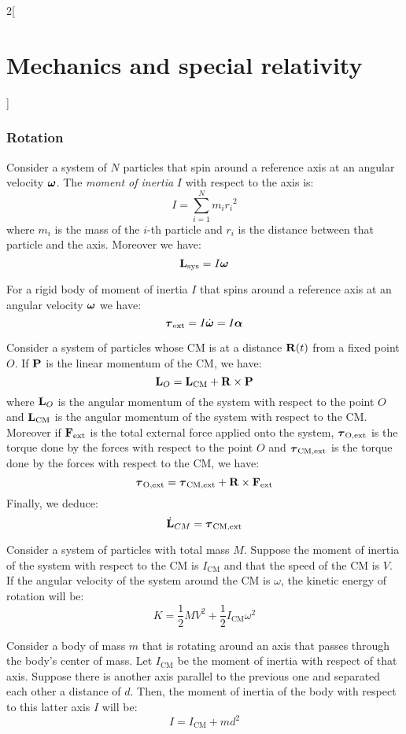 \documentclass[../../../main.tex]{subfiles}
\begin{document}
\begin{multicols}{2}[\section{Mechanics and special relativity}]
    \subsubsection*{Rotation}
    \begin{definition}
        Consider a system of $N$ particles that spin around a reference axis at an angular velocity $\vb*{\omega}$. The \textit{moment of inertia} $I$ with respect to the axis is: $$I=\sum_{i=1}^Nm_i{r_i}^2$$
        where $m_i$ is the mass of the $i$-th particle and $r_i$ is the distance between that particle and the axis. Moreover we have: $$\boldsymbol{\mathrm{L}}_\text{sys}=I\vb*{\omega}$$
    \end{definition}
    \begin{prop}
        For a rigid body of moment of inertia $I$ that spins around a reference axis at an angular velocity $\vb*{\omega}$ we have: $$\vb*{\tau}_\text{ext}=I\dot{\vb*{\omega}}=I\vb*{\alpha}$$
    \end{prop}
    \begin{prop}
        Consider a system of particles whose CM is at a distance $\boldsymbol{\mathrm{R}}(t)$ from a fixed point $O$. If $\boldsymbol{\mathrm{P}}$ is the linear momentum of the CM, we have: $$\boldsymbol{\mathrm{L}}_O=\boldsymbol{\mathrm{L}}_\text{CM}+\boldsymbol{\mathrm{R}}\times\boldsymbol{\mathrm{P}}$$ where $\boldsymbol{\mathrm{L}}_O$ is the angular momentum of the system with respect to the point $O$ and $\boldsymbol{\mathrm{L}}_\text{CM}$ is the angular momentum of the system with respect to the CM. Moreover if $\boldsymbol{\mathrm{F}}_\text{ext}$ is the total external force applied onto the system, $\vb*{\tau}_\text{O,ext}$ is the torque done by the forces with respect to the point $O$ and $\vb*{\tau}_\text{CM,ext}$ is the torque done by the forces with respect to the CM, we have: $$\vb*{\tau}_\text{O,ext}=\vb*{\tau}_\text{CM,ext}+\boldsymbol{\mathrm{R}}\times\boldsymbol{\mathrm{F}}_\text{ext}$$ Finally, we deduce: $$\dot{\boldsymbol{\mathrm{L}}}_{CM}=\vb*{\tau}_\text{CM,ext}$$
    \end{prop}
    \begin{prop}
        Consider a system of particles with total mass $M$. Suppose the moment of inertia of the system with respect to the CM is $I_\text{CM}$ and that the speed of the CM is $V$. If the angular velocity of the system around the CM is $\omega$, the kinetic energy of rotation will be: $$K=\frac{1}{2}MV^2+\frac{1}{2}I_\text{CM}\omega^2$$
    \end{prop}
    \begin{theorem}
        Consider a body of mass $m$ that is rotating around an axis that passes through the body's center of mass. Let $I_\text{CM}$ be the moment of inertia with respect of that axis. Suppose there is another axis parallel to the previous one and separated each other a distance of $d$. Then, the moment of inertia of the body with respect to this latter axis $I$ will be:
        $$I=I_\text{CM}+md^2$$
    \end{theorem}

\end{multicols}
\end{document}
